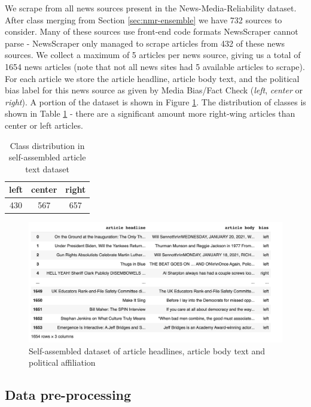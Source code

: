 We scrape from all news sources present in the News-Media-Reliability dataset. After class merging from Section \ref{sec:nmr-ensemble} we have 732 sources to consider. Many of these sources use front-end code formats NewsScraper cannot parse - NewsScraper only managed to scrape articles from 432 of these news sources. We collect a maximum of 5 articles per news source, giving us a total of 1654 news articles (note that not all news sites had 5 available articles to scrape). For each article we store the article headline, article body text, and the political bias label for this news source as given by Media Bias/Fact Check (\textit{left}, \textit{center} or \textit{right}). A portion of the dataset is shown in Figure \ref{fig:nmr-bert-data}. The distribution of classes is shown in Table \ref{tab:nmr-bert-data-classes} - there are a significant amount more right-wing articles than center or left articles.

\begin{table}[h]
    \centering
    \begin{tabular}{|c|c|c|}
        \hline
        left & center & right \\
        \hline
        430 & 567 & 657 \\
        \hline
    \end{tabular}
    \caption{Class distribution in self-assembled article text dataset}
    \label{tab:nmr-bert-data-classes}
\end{table}

\begin{figure}
    \centering
    \includegraphics[scale=0.29]{0-img/nmr-bert-data.png}
    \caption{Self-assembled dataset of article headlines, article body text and political affiliation}
    \label{fig:nmr-bert-data}
\end{figure}

\subsection{Data pre-processing}

